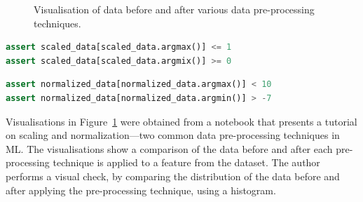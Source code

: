 \documentclass[conference]{IEEEtran}
\begin{document}
\begin{figure}
  \caption{Visualisation of data before and after various data pre-processing techniques.}
  \label{fig:data-pre-process}
\end{figure}

\begin{lstlisting}[language=Python, caption={Assertion to check that the mix and max of a feature fall within specified threshold derived from the visualisation presented in Figure~\ref{fig:scale}.}, label={lst:scale}]
assert scaled_data[scaled_data.argmax()] <= 1
assert scaled_data[scaled_data.argmix()] >= 0
\end{lstlisting}

\begin{lstlisting}[language=Python, caption={Similar premise as Listing~\ref{lst:scale}, however this assertion is based on Figure~\ref{fig:normal}.}, label={lst:normal}]
assert normalized_data[normalized_data.argmax()] < 10
assert normalized_data[normalized_data.argmin()] > -7
\end{lstlisting}

Visualisations in Figure~\ref{fig:data-pre-process} were obtained from a notebook that presents a tutorial on scaling and normalization---two common data pre-processing techniques in ML. The visualisations show a comparison of the data before and after each pre-processing technique is applied to a feature from the dataset. The author performs a visual check, by comparing the distribution of the data before and after applying the pre-processing technique, using a histogram.
\end{document}
